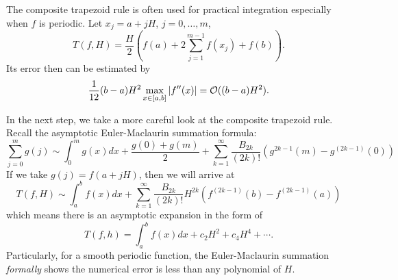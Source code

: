 \begin{example}
    The composite trapezoid rule is often used for practical integration especially when $f$ is periodic. Let $x_j = a + j H$, $j=0,\dots, m$, 
    $$T(f, H) = \frac{H}{2} \left(   f(a) + 2\sum_{j=1}^{m-1} f(x_j)  + f(b)  \right).$$
    Its error then can be estimated by
    \begin{equation}
        \frac{1}{12} (b-a) H^{2} \max_{x\in[a,b]} |f''(x)| =\mathcal O((b-a)H^2).
    \end{equation}

\end{example}
In the next step, we take a more careful look at the composite trapezoid rule. Recall the asymptotic Euler-Maclaurin summation formula: 
\begin{equation}
\sum_{j=0}^m g(j) \sim \int_0^m g(x) dx + \frac{g(0) + g(m)}{2} + \sum_{k=1}^{\infty} \frac{B_{2k}}{(2k)!}(g^{{2k-1}}(m) - g^{(2k-1)}(0))
\end{equation}
If we take $g(j) = f(a + jH)$, then we will arrive at 
\begin{equation}
    T(f, H)\sim \int_a^b f(x) dx + \sum_{k=1}^{\infty} \frac{B_{2k}}{(2k)!} H^{2k}\left(f^{(2k-1)}(b) - f^{(2k-1)}(a) \right) 
\end{equation}
which means there is an asymptotic expansion in the form of 
\begin{equation}\label{EQ: TRAP EXP}
    T(f, h) = \int_a^b f(x) dx + c_2 H^2 + c_4 H^4 + \cdots.
\end{equation}
Particularly, for a smooth periodic function, the Euler-Maclaurin summation \emph{formally} shows the numerical error is less than any polynomial of $H$.


